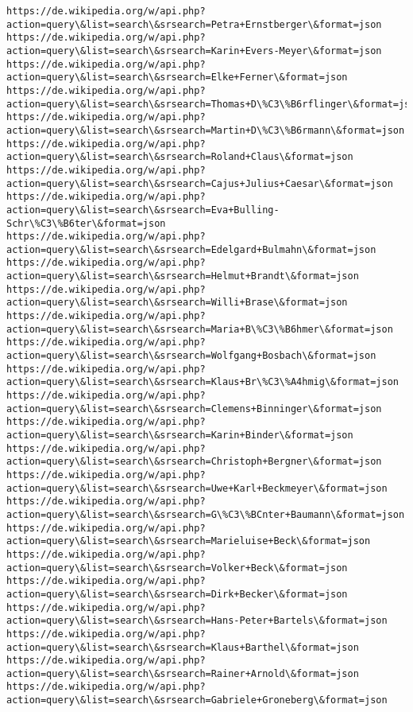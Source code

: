 \documentclass[11pt]{article}
\begin{document}
\begin{Verbatim}[commandchars=\\\{\}]
https://de.wikipedia.org/w/api.php?action=query\&list=search\&srsearch=Petra+Ernstberger\&format=json
https://de.wikipedia.org/w/api.php?action=query\&list=search\&srsearch=Karin+Evers-Meyer\&format=json
https://de.wikipedia.org/w/api.php?action=query\&list=search\&srsearch=Elke+Ferner\&format=json
https://de.wikipedia.org/w/api.php?action=query\&list=search\&srsearch=Thomas+D\%C3\%B6rflinger\&format=json
https://de.wikipedia.org/w/api.php?action=query\&list=search\&srsearch=Martin+D\%C3\%B6rmann\&format=json
https://de.wikipedia.org/w/api.php?action=query\&list=search\&srsearch=Roland+Claus\&format=json
https://de.wikipedia.org/w/api.php?action=query\&list=search\&srsearch=Cajus+Julius+Caesar\&format=json
https://de.wikipedia.org/w/api.php?action=query\&list=search\&srsearch=Eva+Bulling-Schr\%C3\%B6ter\&format=json
https://de.wikipedia.org/w/api.php?action=query\&list=search\&srsearch=Edelgard+Bulmahn\&format=json
https://de.wikipedia.org/w/api.php?action=query\&list=search\&srsearch=Helmut+Brandt\&format=json
https://de.wikipedia.org/w/api.php?action=query\&list=search\&srsearch=Willi+Brase\&format=json
https://de.wikipedia.org/w/api.php?action=query\&list=search\&srsearch=Maria+B\%C3\%B6hmer\&format=json
https://de.wikipedia.org/w/api.php?action=query\&list=search\&srsearch=Wolfgang+Bosbach\&format=json
https://de.wikipedia.org/w/api.php?action=query\&list=search\&srsearch=Klaus+Br\%C3\%A4hmig\&format=json
https://de.wikipedia.org/w/api.php?action=query\&list=search\&srsearch=Clemens+Binninger\&format=json
https://de.wikipedia.org/w/api.php?action=query\&list=search\&srsearch=Karin+Binder\&format=json
https://de.wikipedia.org/w/api.php?action=query\&list=search\&srsearch=Christoph+Bergner\&format=json
https://de.wikipedia.org/w/api.php?action=query\&list=search\&srsearch=Uwe+Karl+Beckmeyer\&format=json
https://de.wikipedia.org/w/api.php?action=query\&list=search\&srsearch=G\%C3\%BCnter+Baumann\&format=json
https://de.wikipedia.org/w/api.php?action=query\&list=search\&srsearch=Marieluise+Beck\&format=json
https://de.wikipedia.org/w/api.php?action=query\&list=search\&srsearch=Volker+Beck\&format=json
https://de.wikipedia.org/w/api.php?action=query\&list=search\&srsearch=Dirk+Becker\&format=json
https://de.wikipedia.org/w/api.php?action=query\&list=search\&srsearch=Hans-Peter+Bartels\&format=json
https://de.wikipedia.org/w/api.php?action=query\&list=search\&srsearch=Klaus+Barthel\&format=json
https://de.wikipedia.org/w/api.php?action=query\&list=search\&srsearch=Rainer+Arnold\&format=json
https://de.wikipedia.org/w/api.php?action=query\&list=search\&srsearch=Gabriele+Groneberg\&format=json

\end{Verbatim}
\end{document}
